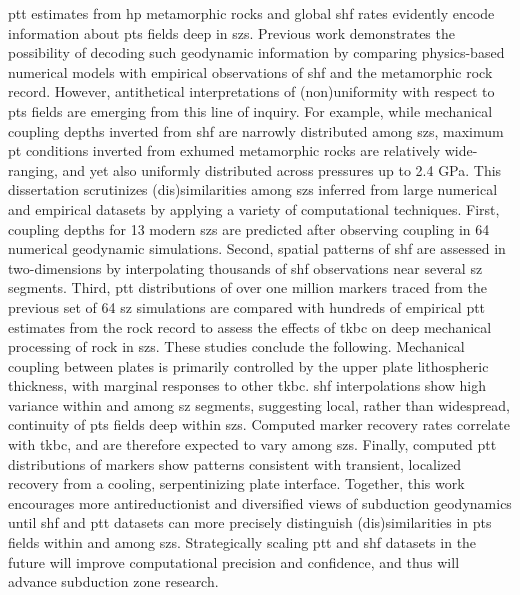 \Gls{ptt} estimates from \gls{hp} metamorphic rocks and global \gls{shf} rates evidently encode information about \gls{pts} fields deep in \glspl{sz}. Previous work demonstrates the possibility of decoding such geodynamic information by comparing physics-based numerical models with empirical observations of \gls{shf} and the metamorphic rock record. However, antithetical interpretations of (non)uniformity with respect to \gls{pts} fields are emerging from this line of inquiry. For example, while
mechanical coupling depths inverted from \gls{shf} are narrowly distributed among \glspl{sz}, maximum \gls{pt} conditions inverted from exhumed metamorphic rocks are relatively wide-ranging, and yet also uniformly distributed across pressures up to 2.4 GPa. This dissertation scrutinizes (dis)similarities among \glspl{sz} inferred from large numerical and empirical datasets by applying a variety of computational techniques. First, coupling depths for 13 modern \glspl{sz} are predicted after observing coupling in 64 numerical
geodynamic simulations. Second, spatial patterns of \gls{shf} are assessed in two-dimensions by interpolating thousands of \gls{shf} observations near several \gls{sz} segments. Third, \gls{ptt} distributions of over one million markers traced from the previous set of 64 \gls{sz} simulations are compared with hundreds of empirical \gls{ptt} estimates from the rock record to assess the effects of \gls{tkbc} on deep mechanical processing of rock in \glspl{sz}. These studies conclude the following. Mechanical
coupling between plates is primarily controlled by the upper plate lithospheric thickness, with marginal responses to other \gls{tkbc}. \Gls{shf} interpolations show high variance within and among \gls{sz} segments, suggesting local, rather than widespread, continuity of \gls{pts} fields deep within \glspl{sz}. Computed marker recovery rates correlate with \gls{tkbc}, and are therefore expected to vary among \glspl{sz}. Finally, computed \gls{ptt} distributions
of markers show patterns consistent with transient, localized recovery from a cooling, serpentinizing plate interface. Together, this work encourages more antireductionist and diversified views of subduction geodynamics until \gls{shf} and \gls{ptt} datasets can more precisely distinguish (dis)similarities in \gls{pts} fields within and among \glspl{sz}. Strategically scaling \gls{ptt} and \gls{shf} datasets in the future will improve computational precision and confidence, and thus will advance subduction zone research.